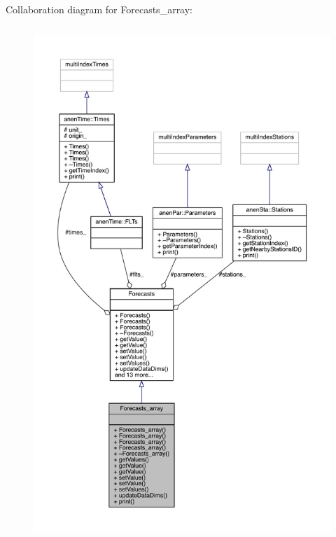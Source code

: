 Collaboration diagram for Forecasts\+\_\+array\+:\nopagebreak
\begin{figure}[H]
\begin{center}
\leavevmode
\includegraphics[height=550pt]{class_forecasts__array__coll__graph}
\end{center}
\end{figure}
